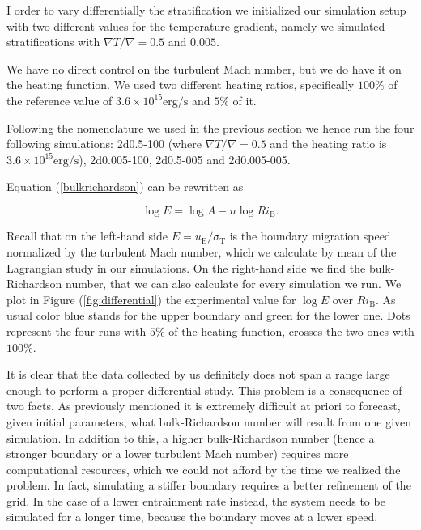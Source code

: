 I order to vary differentially the stratification we initialized our simulation setup with two different values for the temperature gradient, namely we simulated stratifications with $\nabla T / \nabla = 0.5$ and  $0.005$. 

We have no direct control on the turbulent Mach number, but we do have it on the heating function. We used two different heating ratios, specifically $100 \%$ of the reference value of $3.6 \times 10^{15} \mathrm{erg/s}$ and $5 \%$ of it.

Following the nomenclature we used in the previous section we hence run the four following simulations: 2d0.5-100 (where $\nabla T / \nabla = 0.5$ and the heating ratio is  $3.6 \times 10^{15} \mathrm{erg/s}$), 2d0.005-100, 2d0.5-005 and 2d0.005-005.

Equation (\ref{bulkrichardson}) can be rewritten as

\begin{equation}\label{eq:logaritmicbulk}
	\log{E} = \log{A} - n \log{Ri_{\mathrm{B}}}.
\end{equation}

Recall that on the left-hand side $E=u_{\mathrm{E}}/\sigma_{\mathrm{T}}$ is the boundary migration speed normalized by the turbulent Mach number, which we calculate by mean of the Lagrangian study in our simulations. On the right-hand side we find the bulk-Richardson number, that we can also calculate for every simulation we run. We plot in Figure (\ref{fig:differential}) the experimental value for $\log E$ over $Ri_{\mathrm{B}}$. As usual color blue stands for the upper boundary and green for the lower one. Dots represent the four runs with $5 \%$ of the heating function, crosses the two ones with $100 \%$.

It is clear that the data collected by us definitely does not span a range large enough to perform a proper differential study. This problem is a consequence of two facts. As previously mentioned it is extremely difficult at priori to forecast, given initial parameters, what bulk-Richardson number will result from one given simulation. In addition to this, a higher bulk-Richardson number (hence a stronger boundary or a lower turbulent Mach number) requires more computational resources, which we could not afford by the time we realized the problem. In fact, simulating a stiffer boundary requires a better refinement of the grid. In the case of a lower entrainment rate instead, the system needs to be simulated for a longer time, because the boundary moves at a lower speed.


